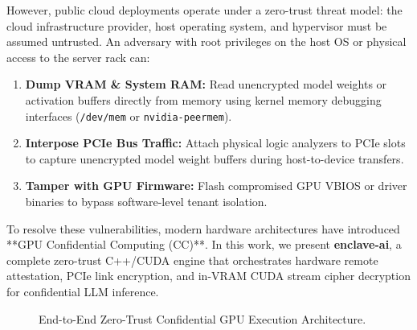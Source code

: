 \documentclass[11pt,a4paper]{article}
\begin{document}
However, public cloud deployments operate under a zero-trust threat model: the cloud infrastructure provider, host operating system, and hypervisor must be assumed untrusted. An adversary with root privileges on the host OS or physical access to the server rack can:
\begin{enumerate}
    \item \textbf{Dump VRAM & System RAM:} Read unencrypted model weights or activation buffers directly from memory using kernel memory debugging interfaces (\texttt{/dev/mem} or \texttt{nvidia-peermem}).
    \item \textbf{Interpose PCIe Bus Traffic:} Attach physical logic analyzers to PCIe slots to capture unencrypted model weight buffers during host-to-device transfers.
    \item \textbf{Tamper with GPU Firmware:} Flash compromised GPU VBIOS or driver binaries to bypass software-level tenant isolation.
\end{enumerate}

To resolve these vulnerabilities, modern hardware architectures have introduced **GPU Confidential Computing (CC)**. In this work, we present \textbf{enclave-ai}, a complete zero-trust C++/CUDA engine that orchestrates hardware remote attestation, PCIe link encryption, and in-VRAM CUDA stream cipher decryption for confidential LLM inference.

\begin{figure}[h!]
\centering
{}
\caption{End-to-End Zero-Trust Confidential GPU Execution Architecture.}
\label{fig:confidential_architecture}
\end{figure}
\end{document}
